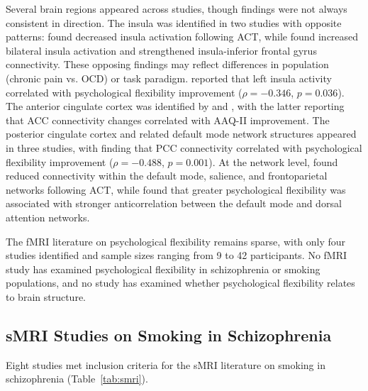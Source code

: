 \documentclass[12pt]{article}
\begin{document}
Several brain regions appeared across studies, though findings were not always consistent in direction. The insula was identified in two studies with opposite patterns: \citet{smallwood2016} found decreased insula activation following ACT, while \citet{lee2023} found increased bilateral insula activation and strengthened insula-inferior frontal gyrus connectivity. These opposing findings may reflect differences in population (chronic pain vs. OCD) or task paradigm. \citet{lee2023} reported that left insula activity correlated with psychological flexibility improvement ($\rho = -0.346$, $p = 0.036$). The anterior cingulate cortex was identified by \citet{smallwood2016} and \citet{aytur2021}, with the latter reporting that ACC connectivity changes correlated with AAQ-II improvement. The posterior cingulate cortex and related default mode network structures appeared in three studies, with \citet{lee2023} finding that PCC connectivity correlated with psychological flexibility improvement ($\rho = -0.488$, $p = 0.001$). At the network level, \citet{aytur2021} found reduced connectivity within the default mode, salience, and frontoparietal networks following ACT, while \citet{cho2025} found that greater psychological flexibility was associated with stronger anticorrelation between the default mode and dorsal attention networks.

The fMRI literature on psychological flexibility remains sparse, with only four studies identified and sample sizes ranging from 9 to 42 participants. No fMRI study has examined psychological flexibility in schizophrenia or smoking populations, and no study has examined whether psychological flexibility relates to brain structure.

\subsection{sMRI Studies on Smoking in Schizophrenia}

Eight studies met inclusion criteria for the sMRI literature on smoking in schizophrenia (Table~\ref{tab:smri}).
\end{document}
